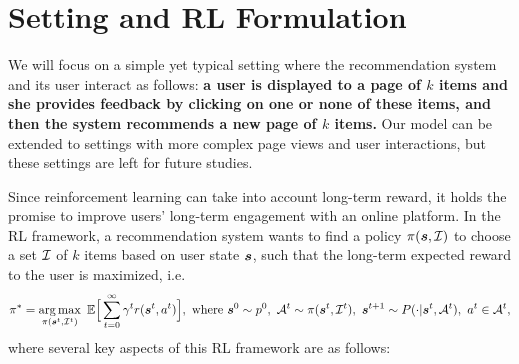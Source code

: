 \documentclass{article} %
\begin{document}
\vspace{-3mm}
\section{Setting and RL Formulation}
\vspace{-3mm}

We will focus on a simple yet typical setting where the recommendation system and its user interact as follows: {\bf a user is displayed to a page of $k$ items and she provides feedback by clicking on one or none of these items, and then the system recommends a new page of $k$ items.} Our model can be extended to settings with more complex page views and user interactions, but these settings are left for future studies. 

Since reinforcement learning can take into account long-term reward, it holds the promise to improve users' long-term engagement with an online platform. In the RL framework, a recommendation system wants to find a policy $\pi({\bm{s}}, {\mathcal{I}})$ to choose a set ${\mathcal{I}}$ of $k$ items based on user state ${\bm{s}}$, such that the long-term expected reward to the user is maximized, i.e.
{\small \begin{equation}
    \pi^\ast = \operatorname*{arg\,max}_{\pi({\bm{s}}^t,{\mathcal{I}}^t)}~\mathbb{E}\Big[\sum_{t=0}^{\infty} \gamma^t r({\bm{s}}^t, a^t)\Big],~\text{where}~{\bm{s}}^0\sim p^0,~{\mathcal{A}}^t \sim \pi({\bm{s}}^t,{\mathcal{I}}^t),~{\bm{s}}^{t+1} \sim P(\cdot | {\bm{s}}^t, {\mathcal{A}}^t),~a^t \in {\mathcal{A}}^t, 
    \label{eq:rl}
\end{equation}}
where several key aspects of this RL framework are as follows: 
\end{document}
